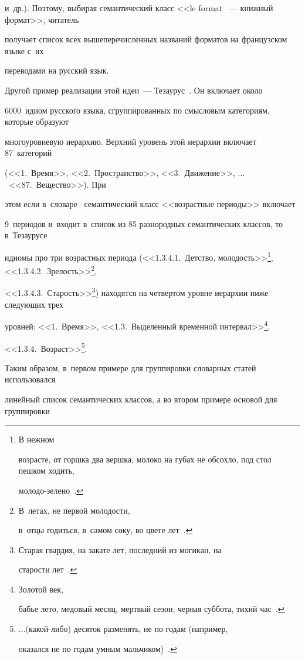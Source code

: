 и~др.). Поэтому, выбирая семантический класс <<le format ~--- книжный формат>>, читатель 

получает список всех вышеперечисленных названий форматов на французском языке с~их 

переводами на русский язык.

  

  Другой пример реализации этой идеи~--- Тезаурус~\cite{10-vz}. Он включает около 

6000~идиом русского языка, сгруппированных по смысловым категориям, которые образуют 

многоуровневую иерархию. Верхний уровень этой иерархии включает 87~категорий 

(<<1.~Время>>, <<2.~Пространство>>, <<3.~Движение>>, $\ldots$\ <<87.~Вещество>>). При 

этом если в~словаре~\cite{9-vz} семантический класс <<возрастные периоды>> включает 

9~периодов и~входит в~список из 85 разнородных семантических классов, то в~Тезаурусе 

идиомы про три возрастных периода (<<1.3.4.1.~Детство, молодость>>\footnote[2]{В нежном 

возрасте, от горшка два вершка, молоко на губах не обсохло, под стол пешком ходить, 

молодо-зелено~\cite{10-vz}.}, <<1.3.4.2.~Зрелость>>\footnote[3]{В~летах, не первой молодости, 

в~отцы годиться, в~самом соку, во цвете лет~\cite{10-vz}.}, 

<<1.3.4.3.~Старость>>\footnote[4]{Старая гвардия, на закате лет, последний из могикан, на 

старости лет~\cite{10-vz}.}) находятся на четвертом уровне иерархии ниже следующих трех 

уровней: <<1.~Время>>, <<1.3.~Выделенный временной интервал>>\footnote[5]{Золотой век, 

бабье лето, медовый месяц, мертвый сезон, черная суббота, тихий час~\cite{10-vz}.}, 

<<1.3.4.~Возраст>>\footnote[6]{$\ldots$(какой-либо) десяток разменять, не по годам (например, 

оказался не по годам умным мальчиком)~\cite{10-vz}.}.

  

  Таким образом, в~первом примере для группировки словарных статей использовался 

линейный список семантических классов, а во втором примере основой для группировки 

